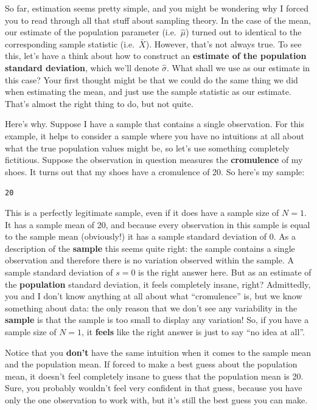 \documentclass[
]{book}
\begin{document}
So far, estimation seems pretty simple, and you might be wondering why I forced you to read through all that stuff about sampling theory. In the case of the mean, our estimate of the population parameter (i.e.~\(\hat\mu\)) turned out to identical to the corresponding sample statistic (i.e.~\(\bar{X}\)). However, that's not always true. To see this, let's have a think about how to construct an \textbf{estimate of the population standard deviation}, which we'll denote \(\hat\sigma\). What shall we use as our estimate in this case? Your first thought might be that we could do the same thing we did when estimating the mean, and just use the sample statistic as our estimate. That's almost the right thing to do, but not quite.

Here's why. Suppose I have a sample that contains a single observation. For this example, it helps to consider a sample where you have no intuitions at all about what the true population values might be, so let's use something completely fictitious. Suppose the observation in question measures the \textbf{cromulence} of my shoes. It turns out that my shoes have a cromulence of 20. So here's my sample:

\texttt{20}

This is a perfectly legitimate sample, even if it does have a sample size of \(N=1\). It has a sample mean of 20, and because every observation in this sample is equal to the sample mean (obviously!) it has a sample standard deviation of 0. As a description of the \textbf{sample} this seems quite right: the sample contains a single observation and therefore there is no variation observed within the sample. A sample standard deviation of \(s = 0\) is the right answer here. But as an estimate of the \textbf{population} standard deviation, it feels completely insane, right? Admittedly, you and I don't know anything at all about what ``cromulence'' is, but we know something about data: the only reason that we don't see any variability in the \textbf{sample} is that the sample is too small to display any variation! So, if you have a sample size of \(N=1\), it \textbf{feels} like the right answer is just to say ``no idea at all''.

Notice that you \textbf{don't} have the same intuition when it comes to the sample mean and the population mean. If forced to make a best guess about the population mean, it doesn't feel completely insane to guess that the population mean is 20. Sure, you probably wouldn't feel very confident in that guess, because you have only the one observation to work with, but it's still the best guess you can make.
\end{document}
